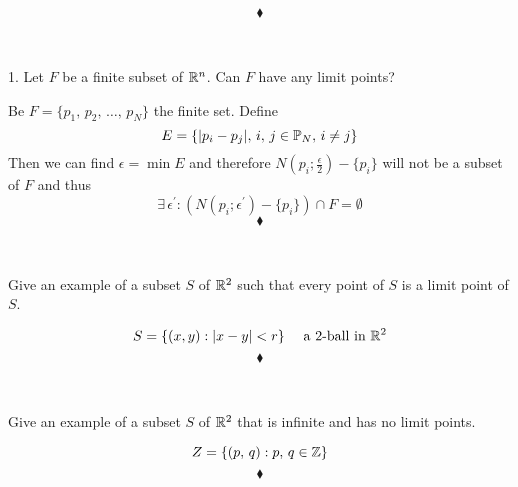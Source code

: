 $$\blacklozenge$$\\


\newpage


\renewcommand{\thesubsection}{\thesection.\arabic{subsection}}
\setcounter{subsection}{0}

\subsection{}
\begin{tcolorbox}
1. Let $F$ be a finite subset of $\mathbb{R}^n$. Can $F$ have any limit points?
\end{tcolorbox}
Be $F=\{p_1,\, p_2,\, \dots ,\, p_N\}$ the finite set. Define 
$$E=\{|p_i-p_j|,\, i,\, j\in \mathbb{P}_N,\, i\neq j\}$$
Then we can find $\epsilon=\min E$ and therefore $N(p_i;\frac{\epsilon}{2})-\{p_i\}$ will not be a subset of $F$ and thus  \\
$$\exists \,\epsilon^{'}: \left(N(p_i;\epsilon^{'})-\{p_i\}\right)\cap F=\emptyset$$
$$\blacklozenge$$\\


\subsection{}
\begin{tcolorbox}
Give an example of a subset $S$ of $\mathbb{R}^2$ such that every point of $S$ is a limit point of $S$.
\end{tcolorbox}
$$S=\{(x,y): |x-y|<r\}\quad \text{ a }2\text{-ball in } \mathbb{R}^2$$
$$\blacklozenge$$\\


\subsection{}
\begin{tcolorbox}
Give an example of a subset $S$ of $\mathbb{R}^2$ that is infinite and has no limit points.
\end{tcolorbox}
$$Z=\{(p,\, q):p,\, q\in \mathbb{Z}\}$$
$$\blacklozenge$$\\


